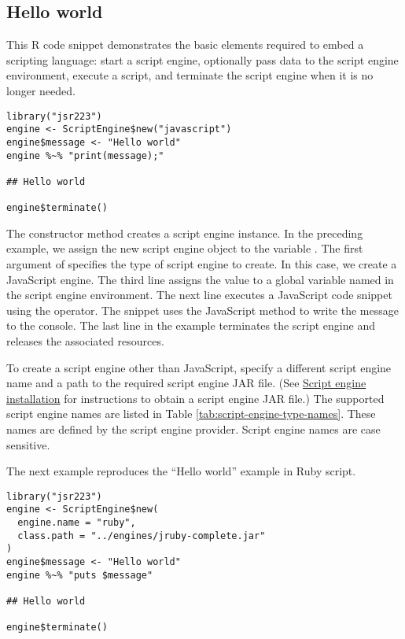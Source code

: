 \subsection{Hello world}

This R code snippet demonstrates the basic elements required to embed a scripting language: start a script engine, optionally pass data to the script engine environment, execute a script, and terminate the script engine when it is no longer needed.

\begin{verbatim}
library("jsr223")
engine <- ScriptEngine$new("javascript")
engine$message <- "Hello world"
engine %~% "print(message);"

## Hello world

engine$terminate()
\end{verbatim}

The  constructor method creates a script engine instance. In the preceding example, we assign the new script engine object to the variable . The first argument of  specifies the type of script engine to create. In this case, we create a JavaScript engine. The third line assigns the value  to a global variable named  in the script engine environment. The next line executes a JavaScript code snippet using the \code{\%$\sim$\%} operator. The snippet uses the JavaScript  method to write the message to the console. The last line in the example terminates the script engine and releases the associated resources.

To create a script engine other than JavaScript, specify a different script engine name and a path to the required script engine JAR file. (See \hyperlink{scriptengineinstallation}{Script engine installation} for instructions to obtain a script engine JAR file.) The supported script engine names are listed in Table \ref{tab:script-engine-type-names}. These names are defined by the script engine provider.  Script engine names are case sensitive.

The next example reproduces the “Hello world” example in Ruby script.

\begin{verbatim}
library("jsr223")
engine <- ScriptEngine$new(
  engine.name = "ruby",
  class.path = "../engines/jruby-complete.jar"
)
engine$message <- "Hello world"
engine %~% "puts $message"

## Hello world

engine$terminate()
\end{verbatim}


